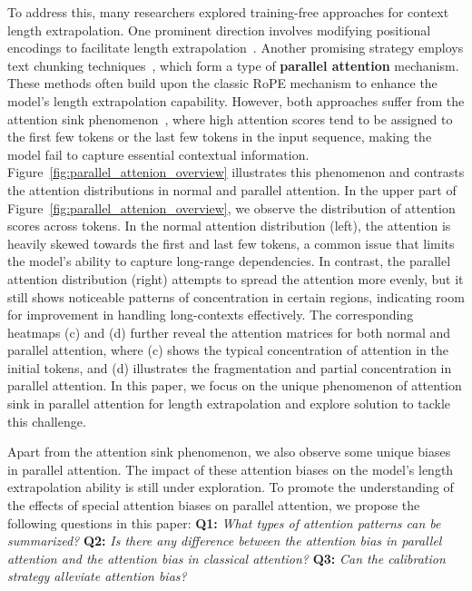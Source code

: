 To address this, many researchers explored training-free approaches for context length extrapolation. One prominent direction involves modifying positional encodings to facilitate length extrapolation~\citep{fixedNTK, dynamicNTK, an2024training}. Another promising strategy employs text chunking techniques~\citep{an2024training, xiao2024infllm, ratner2022parallel, zhu2024accelerating}, which form a type of \textbf{parallel attention} mechanism. These methods often build upon the classic RoPE mechanism to enhance the model's length extrapolation capability. However, both approaches suffer from the attention sink phenomenon~\cite{liu2024lost, xiao2023efficient, han2024lm, gu2024attention}, where high attention scores tend to be assigned to the first few tokens or the last few tokens in the input sequence, making the model fail to capture essential contextual information. Figure~\ref{fig:parallel_attenion_overview} illustrates this phenomenon and contrasts the attention distributions in normal and parallel attention. In the upper part of Figure~\ref{fig:parallel_attenion_overview}, we observe the distribution of attention scores across tokens. In the normal attention distribution (left), the attention is heavily skewed towards the first and last few tokens, a common issue that limits the model's ability to capture long-range dependencies. In contrast, the parallel attention distribution (right) attempts to spread the attention more evenly, but it still shows noticeable patterns of concentration in certain regions, indicating room for improvement in handling long-contexts effectively. The corresponding heatmaps (c) and (d) further reveal the attention matrices for both normal and parallel attention, where (c) shows the typical concentration of attention in the initial tokens, and (d) illustrates the fragmentation and partial concentration in parallel attention. In this paper, we focus on the unique phenomenon of attention sink in parallel attention for length extrapolation and explore solution to tackle this challenge.



Apart from the attention sink phenomenon, we also observe some unique biases in parallel attention. The impact of these attention biases on the model's length extrapolation ability is still under exploration. To promote the understanding of the effects of special attention biases on parallel attention, we propose the following questions in this paper:  \textbf{Q1:} \textit{What types of attention patterns can be summarized?} \textbf{Q2:} \textit{Is there any difference between the attention bias in parallel attention and the attention bias in classical attention?} \textbf{Q3:} \textit{Can the calibration strategy alleviate attention bias?} 




